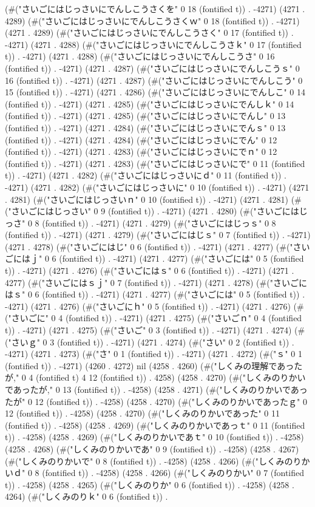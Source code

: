 (#("さいごにはじっさいにでんしこうさくを" 0 18 (fontified t)) . -4271) (4271 . 4289) (#("さいごにはじっさいにでんしこうさくｗ" 0 18 (fontified t)) . -4271) (4271 . 4289) (#("さいごにはじっさいにでんしこうさく" 0 17 (fontified t)) . -4271) (4271 . 4288) (#("さいごにはじっさいにでんしこうさｋ" 0 17 (fontified t)) . -4271) (4271 . 4288) (#("さいごにはじっさいにでんしこうさ" 0 16 (fontified t)) . -4271) (4271 . 4287) (#("さいごにはじっさいにでんしこうｓ" 0 16 (fontified t)) . -4271) (4271 . 4287) (#("さいごにはじっさいにでんしこう" 0 15 (fontified t)) . -4271) (4271 . 4286) (#("さいごにはじっさいにでんしこ" 0 14 (fontified t)) . -4271) (4271 . 4285) (#("さいごにはじっさいにでんしｋ" 0 14 (fontified t)) . -4271) (4271 . 4285) (#("さいごにはじっさいにでんし" 0 13 (fontified t)) . -4271) (4271 . 4284) (#("さいごにはじっさいにでんｓ" 0 13 (fontified t)) . -4271) (4271 . 4284) (#("さいごにはじっさいにでん" 0 12 (fontified t)) . -4271) (4271 . 4283) (#("さいごにはじっさいにでｎ" 0 12 (fontified t)) . -4271) (4271 . 4283) (#("さいごにはじっさいにで" 0 11 (fontified t)) . -4271) (4271 . 4282) (#("さいごにはじっさいにｄ" 0 11 (fontified t)) . -4271) (4271 . 4282) (#("さいごにはじっさいに" 0 10 (fontified t)) . -4271) (4271 . 4281) (#("さいごにはじっさいｎ" 0 10 (fontified t)) . -4271) (4271 . 4281) (#("さいごにはじっさい" 0 9 (fontified t)) . -4271) (4271 . 4280) (#("さいごにはじっさ" 0 8 (fontified t)) . -4271) (4271 . 4279) (#("さいごにはじっｓ" 0 8 (fontified t)) . -4271) (4271 . 4279) (#("さいごにはじｓ" 0 7 (fontified t)) . -4271) (4271 . 4278) (#("さいごにはじ" 0 6 (fontified t)) . -4271) (4271 . 4277) (#("さいごにはｊ" 0 6 (fontified t)) . -4271) (4271 . 4277) (#("さいごには" 0 5 (fontified t)) . -4271) (4271 . 4276) (#("さいごにはｓ" 0 6 (fontified t)) . -4271) (4271 . 4277) (#("さいごにはｓｊ" 0 7 (fontified t)) . -4271) (4271 . 4278) (#("さいごにはｓ" 0 6 (fontified t)) . -4271) (4271 . 4277) (#("さいごには" 0 5 (fontified t)) . -4271) (4271 . 4276) (#("さいごにｈ" 0 5 (fontified t)) . -4271) (4271 . 4276) (#("さいごに" 0 4 (fontified t)) . -4271) (4271 . 4275) (#("さいごｎ" 0 4 (fontified t)) . -4271) (4271 . 4275) (#("さいご" 0 3 (fontified t)) . -4271) (4271 . 4274) (#("さいｇ" 0 3 (fontified t)) . -4271) (4271 . 4274) (#("さい" 0 2 (fontified t)) . -4271) (4271 . 4273) (#("さ" 0 1 (fontified t)) . -4271) (4271 . 4272) (#("ｓ" 0 1 (fontified t)) . -4271) (4260 . 4272) nil (4258 . 4260) (#("しくみの理解であったが," 0 4 (fontified t) 4 12 (fontified t)) . 4258) (4258 . 4270) (#("しくみのりかいであったが," 0 13 (fontified t)) . -4258) (4258 . 4271) (#("しくみのりかいであったが" 0 12 (fontified t)) . -4258) (4258 . 4270) (#("しくみのりかいであったｇ" 0 12 (fontified t)) . -4258) (4258 . 4270) (#("しくみのりかいであった" 0 11 (fontified t)) . -4258) (4258 . 4269) (#("しくみのりかいであっｔ" 0 11 (fontified t)) . -4258) (4258 . 4269) (#("しくみのりかいであｔ" 0 10 (fontified t)) . -4258) (4258 . 4268) (#("しくみのりかいであ" 0 9 (fontified t)) . -4258) (4258 . 4267) (#("しくみのりかいで" 0 8 (fontified t)) . -4258) (4258 . 4266) (#("しくみのりかいｄ" 0 8 (fontified t)) . -4258) (4258 . 4266) (#("しくみのりかい" 0 7 (fontified t)) . -4258) (4258 . 4265) (#("しくみのりか" 0 6 (fontified t)) . -4258) (4258 . 4264) (#("しくみのりｋ" 0 6 (fontified t)) . 